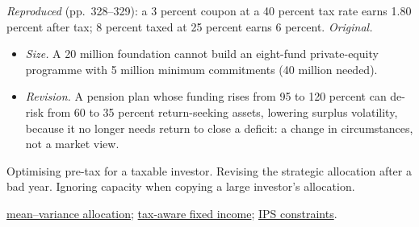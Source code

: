 \begin{qfmethod}
 \emph{Reproduced} (pp.~328--329): a 3 percent coupon at a 40 percent tax rate earns 1.80 percent after tax; 8 percent taxed at 25 percent earns 6 percent. \emph{Original.}
\begin{itemize}
\item \emph{Size.} A 20 million foundation cannot build an eight-fund private-equity programme with 5 million minimum commitments (40 million needed).
\item \emph{Revision.} A pension plan whose funding rises from 95 to 120 percent can de-risk from 60 to 35 percent return-seeking assets, lowering surplus volatility, because it no longer needs return to close a deficit: a change in circumstances, not a market view.
\end{itemize}

 Optimising pre-tax for a taxable investor. Revising the strategic allocation after a bad year. Ignoring capacity when copying a large investor's allocation.

 \hyperref[meth:asset-only-allocation-mvo]{mean--variance allocation}; \hyperref[meth:bond-leverage-taxation]{tax-aware fixed income}; \hyperref[meth:investment-policy-statement]{IPS constraints}.

\end{qfmethod}

